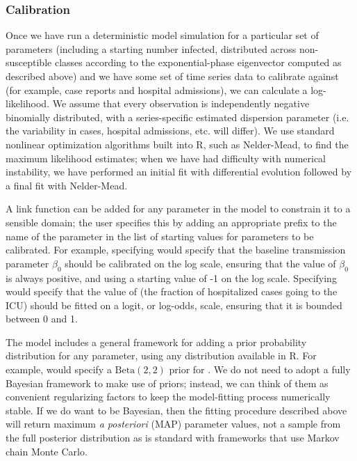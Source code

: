 \documentclass[12pt]{article}\usepackage[]{graphicx}\usepackage[]{color}
\begin{document}
\subsubsection*{Calibration}

Once we have run a deterministic model simulation for a particular
set of parameters (including a starting number infected, distributed
across non-susceptible classes according to the exponential-phase eigenvector
computed as described above) and we have some set of time series data to
calibrate against (for example, case reports and hospital admissions),
we can calculate a log-likelihood. We assume that every observation
is independently negative binomially distributed, with a series-specific
estimated dispersion parameter (i.e. the variability in cases, hospital
admissions, etc. will differ). We use standard nonlinear optimization
algorithms built into R, such as Nelder-Mead, to find the maximum likelihood
estimates; when we have had difficulty with numerical instability, we
have performed an initial fit with differential evolution
\cite{Mull+11} followed by a final fit with Nelder-Mead.

A link function can be added for any parameter in the model to constrain it to
a sensible domain; the user specifies this by adding an appropriate prefix to
the name of the parameter in the list of starting values for parameters to be calibrated. For example,
specifying  would specify that the baseline transmission parameter $\beta_0$
should be calibrated on the log scale, ensuring that the value of $\beta_0$ is always positive,
and using a starting value of -1 on the log scale. Specifying  would specify
that the value of  (the fraction of hospitalized cases going to the ICU) should be fitted
on a logit, or log-odds, scale, ensuring that it is bounded between 0 and 1.

The model includes a general framework for adding a prior probability
distribution for any parameter, using any distribution available in R. For example,
 would specify a $\textrm{Beta}(2,2)$ prior for .
We do not need to adopt a fully Bayesian framework to make use of priors; instead, we
can think of them as convenient regularizing factors to keep the model-fitting process
numerically stable. If we do want to be Bayesian, then the fitting procedure described
above will return maximum \emph{a posteriori} (MAP) parameter values, not a sample from the full
posterior distribution as is standard with frameworks that use Markov chain Monte Carlo.
\end{document}
